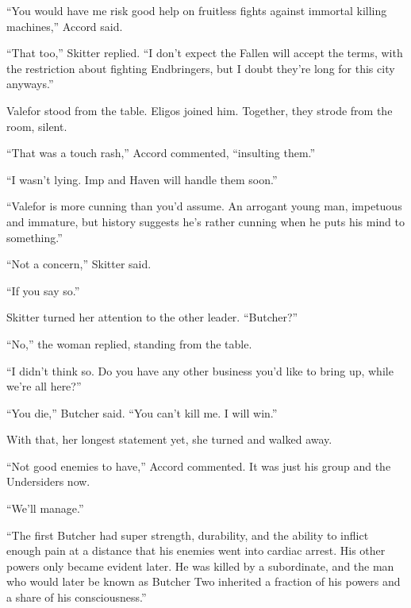 ``You would have me risk good help on fruitless fights against immortal killing machines,'' Accord said.



``That too,'' Skitter replied.  ``I don't expect the Fallen will accept the terms, with the restriction about fighting Endbringers, but I doubt they're long for this city anyways.''



Valefor stood from the table.  Eligos joined him.  Together, they strode from the room, silent.



``That was a touch rash,'' Accord commented, ``insulting them.''



``I wasn't lying.  Imp and Haven will handle them soon.''



``Valefor is more cunning than you'd assume.  An arrogant young man, impetuous and immature, but history suggests he's rather cunning when he puts his mind to something.''



``Not a concern,'' Skitter said.



``If you say so.''



Skitter turned her attention to the other leader.  ``Butcher?''



``No,'' the woman replied, standing from the table.



``I didn't think so.  Do you have any other business you'd like to bring up, while we're all here?''



``You die,'' Butcher said.  ``You can't kill me.  I will win.''



With that, her longest statement yet, she turned and walked away.



``Not good enemies to have,'' Accord commented.  It was just his group and the Undersiders now.



``We'll manage.''



``The first Butcher had super strength, durability, and the ability to inflict enough pain at a distance that his enemies went into cardiac arrest.  His other powers only became evident later.  He was killed by a subordinate, and the man who would later be known as Butcher Two inherited a fraction of his powers and a share of his consciousness.''



